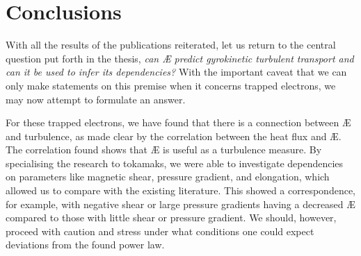 \section{Conclusions}
With all the results of the publications reiterated, let us return to the central question put forth in the thesis, {\it can \AE{} predict gyrokinetic turbulent transport and can it be used to infer its dependencies?} With the important caveat that we can only make statements on this premise when it concerns trapped electrons, we may now attempt to formulate an answer. \par 
For these trapped electrons, we have found that there is a connection between \AE{} and turbulence, as made clear by the correlation between the heat flux and \AE{}. The correlation found shows that \AE{} is useful as a turbulence measure. By specialising the research to tokamaks, we were able to investigate dependencies on parameters like magnetic shear, pressure gradient, and elongation, which allowed us to compare with the existing literature. This showed a correspondence, for example, with negative shear or large pressure gradients having a decreased \AE{} compared to those with little shear or pressure gradient. We should, however, proceed with caution and stress under what conditions one could expect deviations from the found power law. 
